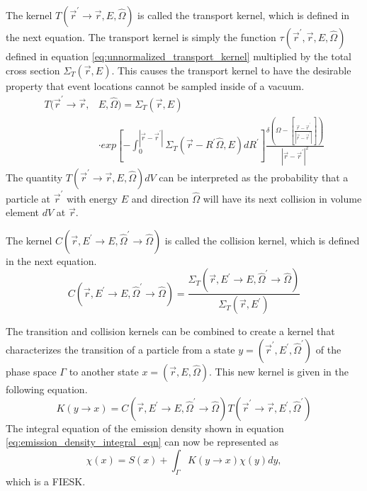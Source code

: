 The kernel $T(\vec{r}^{'} \to \vec{r},E,\hat{\Omega})$ is called the transport
kernel, which is defined in the next equation. The transport kernel is simply
the function $\tau(\vec{r}^{'},\vec{r},E,\hat{\Omega})$ defined in equation 
\ref{eq:unnormalized_transport_kernel} multiplied by the total cross section
$\Sigma_T(\vec{r},E)$. This causes the transport kernel to have the desirable
property that event locations cannot be sampled inside of a vacuum.
\begin{equation}
  \begin{split}
    T(\vec{r}^{'} \to \vec{r},&E,\hat{\Omega}) = \Sigma_T(\vec{r},E) \\
    &\cdot exp\left[-\int_0^{|\vec{r} - \vec{r}^{'}|} 
      \Sigma_T(\vec{r}-R^{'}\hat{\Omega},E)dR^{'} \right] 
    \frac{\delta \left(\Omega - \left[\frac{\vec{r} - \vec{r}^{'}}
        {|\vec{r} - \vec{r}^{'}|}\right]\right)}
    {|\vec{r} - \vec{r}^{'}|^2} 
  \end{split}
\end{equation}
The quantity $T(\vec{r}^{'} \to \vec{r},E,\hat{\Omega})dV$ can be interpreted
as the probability that a particle at $\vec{r}^{'}$ with energy $E$ and 
direction $\hat{\Omega}$ will have its next collision in volume element $dV$
at $\vec{r}$.  

The kernel $C(\vec{r},E^{'} \to E,\hat{\Omega}^{'} \to \hat{\Omega})$ is called
the collision kernel, which is defined in the next equation.
\begin{equation}
  C(\vec{r},E^{'} \to E,\hat{\Omega}^{'} \to \hat{\Omega}) = 
  \frac{\Sigma_T(\vec{r},E^{'} \to E,\hat{\Omega}^{'} \to \hat{\Omega})}
       {\Sigma_T(\vec{r},E^{'})}
\end{equation}

The transition and collision kernels can be combined to create a kernel that
characterizes the transition of a particle from a state 
$y = (\vec{r}^{'},E^{'},\hat{\Omega}^{'})$ of the phase space $\Gamma$ to another 
state $x = (\vec{r},E,\hat{\Omega})$. This new kernel is given in the following 
equation.
\begin{equation}
  K(y \to x) =
  C(\vec{r},E^{'} \to E,\hat{\Omega}^{'} \to \hat{\Omega})
    T(\vec{r}^{'} \to \vec{r},E^{'},\hat{\Omega}^{'})
\end{equation}
The integral equation of the emission density shown in equation 
\ref{eq:emission_density_integral_eqn} can now be represented as
\begin{equation*}
  \chi(x) = S(x) + \int_{\Gamma} K(y \to x)\chi(y)dy,
\end{equation*}
which is a FIESK. 


